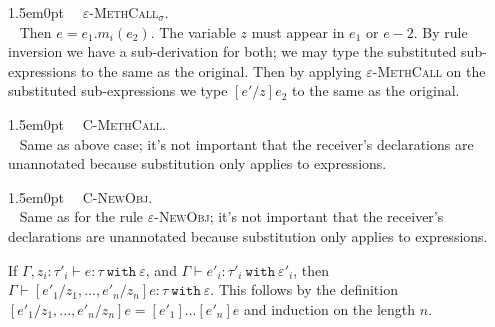 \documentclass{llncs}
\newcommand{\keywadj}[1]{\mathtt{#1}}
\newcommand{\keyw}[1]{\keywadj{#1}~}
\newcommand{\proofcase}[2]{
	\begin{adjustwidth}{1.5em}{0pt}
		\fbox{Case.}~~#1. \\ ~#2
	\end{adjustwidth}
}
\begin{document}
{	\proofcase{\textsc{$\varepsilon$-MethCall$_\sigma$}} {
		Then $e =e _1.m_i(e_2)$. The variable $z$ must appear in $e_1$ or $e-2$. By rule inversion we have a sub-derivation for both; we may type the substituted sub-expressions to the same as the original. Then by applying \textsc{$\varepsilon$-MethCall} on the substituted sub-expressions we type $[e'/z]e_2$ to the same as the original. \\
	}
		
	\proofcase{\textsc{C-MethCall}} {
		Same as above case; it's not important that the receiver's declarations are unannotated because substitution only applies to expressions. \\
	}
	
	\proofcase{\textsc{C-NewObj}} {
		Same as for the rule \textsc{$\varepsilon$-NewObj}; it's not important that the receiver's declarations are unannotated because substitution only applies to expressions.
	}
}

\noindent
{} If $\Gamma, z_i : \tau'_i \vdash e : \tau~\keyw{with} \varepsilon$, and $\Gamma \vdash e'_i : \tau'_i~\keyw{with} \varepsilon'_i$, then $\Gamma \vdash [e'_1/z_1, ..., e'_n/z_n]e : \tau~\keyw{with} \varepsilon$. This follows by the definition $[e'_1/z_1, ..., e'_n/z_n]e = [e'_1]...[e'_n]e$ and induction on the length $n$. \\
\end{document}
